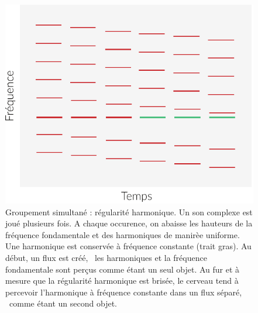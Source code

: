 \begin{figure}[bth]
        \myfloatalign
        \includegraphics[width=.5\linewidth]{gfx/harmo-eps-converted-to}
        \caption[Groupement simultané : régularité harmonique]{Groupement simultané : régularité harmonique. Un son complexe est joué plusieurs fois. A chaque occurence, on abaisse les hauteurs de la fréquence fondamentale et des harmoniques de manirèe uniforme. Une harmonique est conservée à fréquence constante (trait gras). Au début, un flux est créé, \ie~les harmoniques et la fréquence fondamentale sont perçus comme étant un seul objet. Au fur et à mesure que la régularité harmonique est brisée, le cerveau tend à percevoir l'harmonique à fréquence constante dans un flux séparé, \ie~comme étant un second objet.}\label{fig:harmo}
\end{figure}


